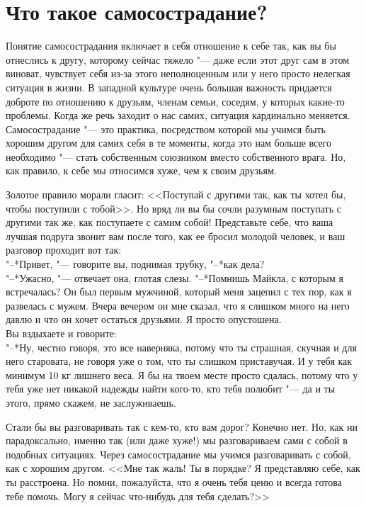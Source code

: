 
\section{Что такое самосострадание?}

Понятие самосострадания включает в себя отношение к себе так, как вы бы отнеслись к другу, которому сейчас тяжело "--- даже если этот друг сам в этом виноват,  чувствует себя из-за этого неполноценным или у него просто нелегкая ситуация в жизни. В западной культуре очень большая важность придается доброте по отношению к друзьям, членам семьи, соседям, у которых какие-то проблемы. Когда же речь заходит о нас самих, ситуация кардинально меняется. Самосострадание "--- это практика, посредством которой мы учимся быть хорошим другом для самих себя в те моменты, когда это нам больше всего необходимо "--- стать собственным союзником вместо собственного врага. Но, как правило, к себе мы относимся хуже, чем к своим друзьям.

Золотое правило морали гласит: <<Поступай с другими так, как ты хотел бы, чтобы поступили с тобой>>. Но вряд ли вы бы сочли разумным поступать с другими так же, как поступаете с самим собой! Представьте себе, что ваша лучшая подруга звонит вам после того, как ее бросил молодой человек, и ваш разговор проходит вот так:\\
"--*Привет, "--- говорите вы, поднимая трубку, "--*как дела?\\
"--*Ужасно, "--- отвечает она, глотая слезы. "--*Помнишь Майкла, с которым я встречалась? Он был первым мужчиной, который меня зацепил с тех пор, как я развелась с мужем. Вчера вечером он мне сказал, что я слишком много на него давлю и что он хочет остаться друзьями. Я просто опустошена.\\
Вы вздыхаете и говорите:\\
"--*Ну, честно говоря, это все наверняка, потому что ты страшная, скучная и для него старовата, не говоря уже о том, что ты слишком приставучая. И у тебя как минимум 10 кг лишнего веса. Я бы на твоем месте просто сдалась, потому что у тебя уже нет никакой надежды найти кого-то, кто тебя полюбит "--- да и ты этого, прямо скажем, не заслуживаешь.

Стали бы вы разговаривать так с кем-то, кто вам дорог? Конечно нет. Но, как ни парадоксально, именно так (или даже хуже!) мы разговариваем сами с собой в подобных ситуациях. Через самосострадание мы учимся разговаривать с собой, как с хорошим другом. <<Мне так жаль! Ты в порядке? Я представляю себе, как ты расстроена. Но помни, пожалуйста, что я очень тебя ценю и всегда готова тебе помочь. Могу я сейчас что-нибудь для тебя сделать?>>

